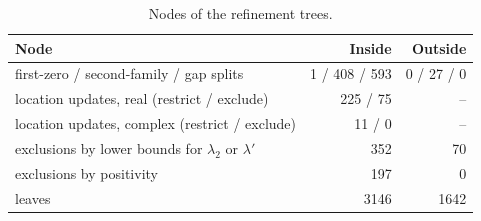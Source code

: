 \documentclass[11pt]{amsart}
\numberwithin{equation}{section}
\theoremstyle{plain}
\theoremstyle{definition}
\theoremstyle{remark}
\newcommand{\1}{\mathbf{1}}
\begin{document}
\begin{table}[ht]
\centering
\small
\begin{tabular}{lrr}
\toprule
Node & Inside & Outside\\
\midrule
first-zero / second-family / gap splits & 1 / 408 / 593 & 0 / 27 / 0\\
location updates, real (restrict / exclude) & 225 / 75 & --\\
location updates, complex (restrict / exclude) & 11 / 0 & --\\
exclusions by lower bounds for $\lambda_2$ or $\lambda'$ & 352 & 70\\
exclusions by positivity & 197 & 0\\
leaves & 3146 & 1642\\
\bottomrule
\end{tabular}
\caption{Nodes of the refinement trees.}
\label{tab:nodes}
\end{table}
\end{document}
